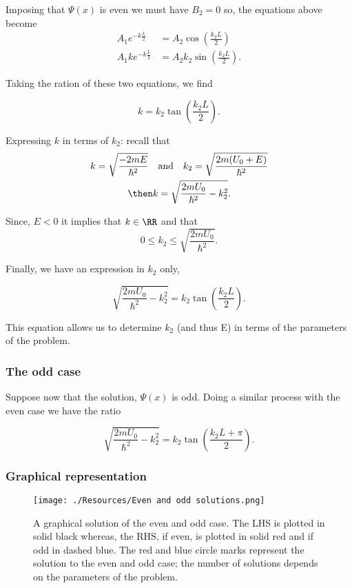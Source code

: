 \documentclass[12pt, a4paper]{article}
\begin{document}
Imposing that \(\Psi(x)\) is even we must have \(B_2 = 0\) so, the equations above become 
\[\begin{aligned}
    A_1 e^{-k \frac{L}{2}} &= A_2 \cos \left(\frac{k_2 L}{2} \right) \\
    A_1 k e^{-k \frac{L}{2}} &= A_2 k_2 \sin \left( \frac{k_2 L}{2} \right).
\end{aligned}\]

Taking the ration of these two equations, we find 

\[k=k_2 \tan\left( \frac{k_2 L}{2} \right).\]

Expressing \(k\) in terms of \(k_2\): recall that 
\[\begin{aligned}
    k = \sqrt{\frac{-2mE}{\hbar^2}} \quad &\text{and} \quad k_2 = \sqrt{\frac{2m(U_0+E)}{\hbar^2}} \\
    \then k &= \sqrt{\frac{2mU_0}{\hbar^2} -k_2^2}.
\end{aligned}\]

Since, \(E<0\) it implies that \(k \in \RR\) and that 
\[0 \leq k_2 \leq \sqrt{\frac{2mU_0}{\hbar^2}}.\]

Finally, we have an expression in \(k_2\) only,

\[\sqrt{\frac{2mU_0}{\hbar^2} - k_2^2} = k_2 \tan \left( \frac{k_2 L}{2} \right).\]

This equation allows us to determine \(k_2\) (and thus E) in terms of the parameters of the problem.

\subsubsection*{The odd case}

Suppose now that the solution, \(\Psi(x)\) is odd. Doing a similar process with the even case  we have the ratio

\[\sqrt{\frac{2mU_0}{\hbar^2} - k_2^2} = k_2 \tan \left( \frac{k_2 L + \pi}{2} \right).\]

\subsubsection*{Graphical representation}

\begin{figure}[H]
     \begin{center}
         \texttt{[image: ./Resources/Even and odd solutions.png]}
         \caption{A graphical solution of the even and odd case. The LHS is plotted in solid black whereas, the RHS, if even, is plotted in solid red and if odd in dashed blue. The red and blue circle marks represent the solution to the even and odd case; the number of solutions depends on the parameters of the problem.}
     \end{center}
\end{figure}
\end{document}
